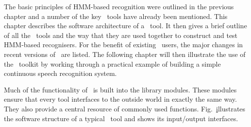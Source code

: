 %
%


The basic principles of HMM-based recognition were outlined in
the previous chapter and a number of the key \HTK\ tools have already
been mentioned.  This chapter describes the software architecture
of a \HTK\ tool.   It then gives a brief outline of all the
\HTK\ tools and the way that they are used together to construct
and test HMM-based recognisers.  For the benefit of existing \HTK\ users,
the major changes in recent versions of \HTK\ are listed.
The following chapter will then illustrate
the use of the \HTK\ toolkit 
by working through a practical example of building a simple 
continuous speech recognition system.


Much of the functionality of \HTK\ is built into the library modules. 
These modules ensure that every tool interfaces to the outside world 
in exactly the same way.  They also provide a central resource of 
commonly used functions.  Fig.~\href{f:softarch} illustrates 
the software
structure of a typical \HTK\ tool and shows its input/output interfaces.

